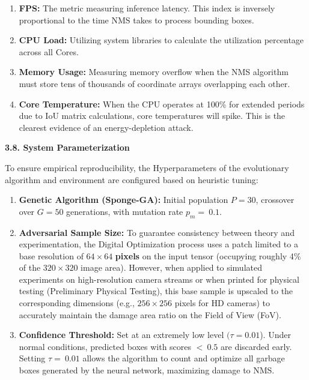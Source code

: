 \documentclass[]{article}
\begin{document}
\begin{enumerate}
\def\labelenumi{\arabic{enumi}.}
\item
  \textbf{FPS:} The metric measuring inference latency. This index is inversely proportional to the time NMS takes to process bounding boxes.
\item
  \textbf{CPU Load:} Utilizing system libraries to calculate the utilization percentage across all Cores.
\item
  \textbf{Memory Usage:} Measuring memory overflow when the NMS algorithm must store tens of thousands of coordinate arrays overlapping each other.
\item
  \textbf{Core Temperature:} When the CPU operates at 100\% for extended periods due to IoU matrix calculations, core temperatures will spike. This is the clearest evidence of an energy-depletion attack.
\end{enumerate}

\textbf{3.8. System Parameterization}

To ensure empirical reproducibility, the Hyperparameters of the evolutionary algorithm and environment are configured based on heuristic tuning:

\begin{enumerate}
\def\labelenumi{\arabic{enumi}.}
\item
  \textbf{Genetic Algorithm (Sponge-GA):} Initial population \(P = 30\), crossover over \(G = 50\) generations, with mutation rate \(p_{m} = \ 0.1\).
\item
  \textbf{Adversarial Sample Size:} To guarantee consistency between theory and experimentation, the Digital Optimization process uses a patch limited to a base resolution of \(64 \times 64\) \textbf{pixels} on the input tensor (occupying roughly 4\% of the \(320 \times 320\) image area). However, when applied to simulated experiments on high-resolution camera streams or when printed for physical testing (Preliminary Physical Testing), this base sample is upscaled to the corresponding dimensions (e.g., \(256 \times 256\) pixels for HD cameras) to accurately maintain the damage area ratio on the Field of View (FoV).
\item
  \textbf{Confidence Threshold:} Set at an extremely low level \((\tau = 0.01\)). Under normal conditions, predicted boxes with scores \(< \ 0.5\) are discarded early. Setting \(\tau = \ 0.01\) allows the algorithm to count and optimize all garbage boxes generated by the neural network, maximizing damage to NMS.
\end{enumerate}
\end{document}
